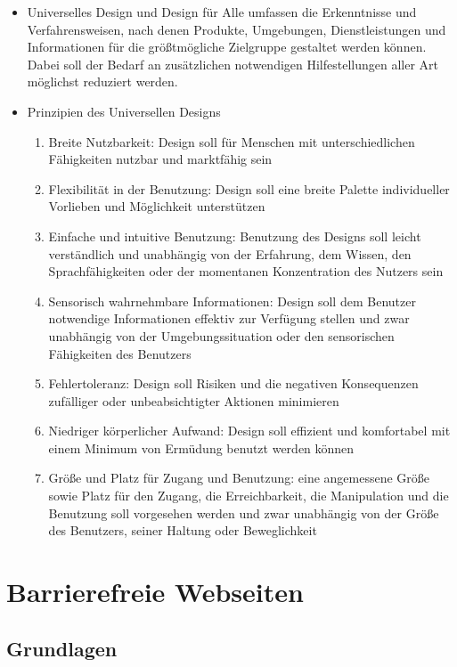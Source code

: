 \documentclass[paper=a4, fontsize=11pt]{scrartcl} %
\numberwithin{equation}{section} %
\numberwithin{figure}{section} %
\numberwithin{table}{section} %
\begin{document}
\begin{itemize}
\item Universelles Design und Design für Alle umfassen die Erkenntnisse und Verfahrensweisen, nach denen Produkte, Umgebungen, Dienstleistungen und Informationen für die größtmögliche Zielgruppe gestaltet werden können. Dabei soll der Bedarf an zusätzlichen notwendigen Hilfestellungen aller Art möglichst reduziert werden.
\item Prinzipien des Universellen Designs
\begin{enumerate}
\item Breite Nutzbarkeit: Design soll für Menschen mit unterschiedlichen Fähigkeiten nutzbar und marktfähig sein
\item Flexibilität in der Benutzung: Design soll eine breite Palette individueller Vorlieben und Möglichkeit unterstützen
\item Einfache und intuitive Benutzung: Benutzung des Designs soll leicht verständlich und unabhängig von der Erfahrung, dem Wissen, den Sprachfähigkeiten oder der momentanen Konzentration des Nutzers sein
\item Sensorisch wahrnehmbare Informationen: Design soll dem Benutzer notwendige Informationen effektiv zur Verfügung stellen und zwar unabhängig von der Umgebungssituation oder den sensorischen Fähigkeiten des Benutzers
\item Fehlertoleranz: Design soll Risiken und die negativen Konsequenzen zufälliger oder unbeabsichtigter Aktionen minimieren
\item Niedriger körperlicher Aufwand: Design soll effizient und komfortabel mit einem Minimum von Ermüdung benutzt werden können
\item Größe und Platz für Zugang und Benutzung: eine angemessene Größe sowie Platz für den Zugang, die Erreichbarkeit, die Manipulation und die Benutzung soll vorgesehen werden und zwar unabhängig von der Größe des Benutzers, seiner Haltung oder Beweglichkeit
\end{enumerate}
\end{itemize}

\section{Barrierefreie Webseiten}

\subsection{Grundlagen}
\end{document}
